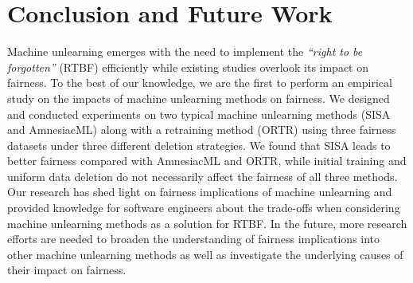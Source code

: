 \section{Conclusion and Future Work}
\label{sec:conclusion}
Machine unlearning emerges with the need to implement the \textit{``right to be forgotten''} (RTBF) efficiently while existing studies overlook its impact on fairness. To the best of our knowledge, we are the first to perform an empirical study on the impacts of machine unlearning methods on fairness. We designed and conducted experiments on two typical machine unlearning methods (SISA and AmnesiacML) along with a retraining method (ORTR) using three fairness datasets under three different deletion strategies. We found that SISA leads to better fairness compared with AmnesiacML and ORTR, while initial training and uniform data deletion do not necessarily affect the fairness of all three methods. Our research has shed light on fairness implications of machine unlearning and provided knowledge for software engineers about the trade-offs when considering machine unlearning methods as a solution for RTBF. In the future, more research efforts are needed to broaden the understanding of fairness implications into other machine unlearning methods as well as investigate the underlying causes of their impact on fairness.

